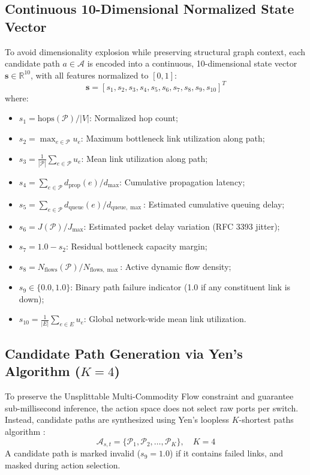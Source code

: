 \documentclass[12pt,a4paper,oneside]{report}
\begin{document}
\subsection{Continuous 10-Dimensional Normalized State Vector}
To avoid dimensionality explosion while preserving structural graph context, each candidate path $a \in \mathcal{A}$ is encoded into a continuous, 10-dimensional state vector $\mathbf{s} \in \mathbb{R}^{10}$, with all features normalized to $[0, 1]$:
\begin{equation}
\mathbf{s} = [s_1, s_2, s_3, s_4, s_5, s_6, s_7, s_8, s_9, s_{10}]^T
\end{equation}
where:
\begin{itemize}[leftmargin=8mm]
  \item $s_1 = \mathrm{hops}(\mathcal{P}) / |V|$: Normalized hop count;
  \item $s_2 = \max_{e \in \mathcal{P}} u_e$: Maximum bottleneck link utilization along path;
  \item $s_3 = \frac{1}{|\mathcal{P}|} \sum_{e \in \mathcal{P}} u_e$: Mean link utilization along path;
  \item $s_4 = \sum_{e \in \mathcal{P}} d_{\mathrm{prop}}(e) / d_{\max}$: Cumulative propagation latency;
  \item $s_5 = \sum_{e \in \mathcal{P}} d_{\mathrm{queue}}(e) / d_{\mathrm{queue,\max}}$: Estimated cumulative queuing delay;
  \item $s_6 = J(\mathcal{P}) / J_{\max}$: Estimated packet delay variation (RFC 3393 jitter);
  \item $s_7 = 1.0 - s_2$: Residual bottleneck capacity margin;
  \item $s_8 = N_{\mathrm{flows}}(\mathcal{P}) / N_{\mathrm{flows,\max}}$: Active dynamic flow density;
  \item $s_9 \in \{0.0, 1.0\}$: Binary path failure indicator (1.0 if any constituent link is down);
  \item $s_{10} = \frac{1}{|E|} \sum_{e \in E} u_e$: Global network-wide mean link utilization.
\end{itemize}

\subsection{Candidate Path Generation via Yen's Algorithm ($K=4$)}
To preserve the Unsplittable Multi-Commodity Flow constraint and guarantee sub-millisecond inference, the action space does not select raw ports per switch. Instead, candidate paths are synthesized using Yen's loopless $K$-shortest paths algorithm \cite{yen1971finding}:
\begin{equation}
\mathcal{A}_{s, t} = \{\mathcal{P}_1, \mathcal{P}_2, \dots, \mathcal{P}_K\}, \quad K = 4
\end{equation}
A candidate path is marked invalid ($s_9 = 1.0$) if it contains failed links, and masked during action selection.
\end{document}
